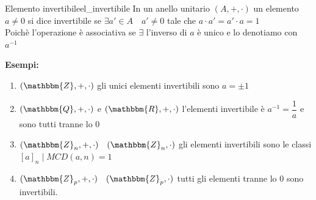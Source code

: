 \documentclass[12pt, letterpaper]{report}
\newcounter{definition}
\newcommand{\nmu}{}
\begin{document}
 		 \begin{definition}{\nmu Elemento invertibile}{el_invertibile}
 			In un anello unitario $(A, +, \cdot)$ un elemento $a \neq 0$ si dice invertibile se $\exists a' \in A \quad a' \neq 0$ tale che $a \cdot a' = a' \cdot a = 1$ \\
 			Poichè l'operazione è associativa se $\exists$ l'inverso di $a$ è unico e lo denotiamo con $a^{-1}$
 		\end{definition}
 		\textbf{Esempi:}
 		\begin{enumerate}
 			\item $(\mathbbm{Z}, +, \cdot)$ gli unici elementi invertibili sono $a = \pm 1$
 			\item $(\mathbbm{Q}, +, \cdot)$ e $(\mathbbm{R}, +, \cdot)$ l'elementi invertibile è $a^{-1} = \dfrac{1}{a}$ e sono tutti tranne lo 0
 			\item $(\mathbbm{Z}_n, +, \cdot) \quad (\mathbbm{Z}_n, \cdot)$ gli elementi invertibili sono le classi $[a]_n \mid MCD(a,n) = 1$
 			\item $(\mathbbm{Z}_p, +, \cdot) \quad (\mathbbm{Z}_p, \cdot)$ tutti gli elementi tranne lo 0 sono invertibili.
 		\end{enumerate}
\end{document}
